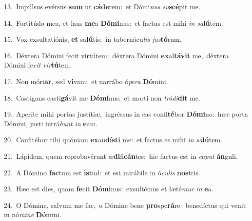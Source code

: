 {\numbfont\textcolor{\numbcolor}{13.}}~Impúlsus evérsus \textbf{sum} ut \textbf{cá}\-\textbf{de}rem:~\star et Dómi\textit{nus} \textit{su}\-\textbf{scé}pit me.\par
{\numbfont\textcolor{\numbcolor}{14.}}~Fortitúdo mea, et laus \textbf{me}\-a \textbf{Dó}\-\textbf{mi}nus:~\star et factus est mihi \textit{in} \textit{sa}\-\textbf{lú}tem.\par
{\numbfont\textcolor{\numbcolor}{15.}}~Vox exsultatiónis, \textbf{et} sa\-\textbf{lú}\-tis:~\star in tabernácu\textit{lis} \textit{jus}\-\textbf{tó}rum.\par
{\numbfont\textcolor{\numbcolor}{16.}}~Déxtera Dómini fecit virtútem:~\dagger déxtera Dómini \textbf{ex}\-al\-\textbf{tá}\-\textbf{vit} me,~\star déxtera Dómini fe\textit{cit} \textit{vir}\-\textbf{tú}tem.\par
{\numbfont\textcolor{\numbcolor}{17.}}~Non móri\-\textbf{ar}\-, sed \textbf{vi}\-vam:~\star et narrábo ó\-\textit{pe}\-\textit{ra} \textbf{Dó}\-mini.\par
{\numbfont\textcolor{\numbcolor}{18.}}~Castígans casti\-\textbf{gá}\-vit me \textbf{Dó}\-\textbf{mi}nus:~\star et morti non \textit{trá}\-\textit{di}\textbf{dit} me.\par
{\numbfont\textcolor{\numbcolor}{19.}}~Aperíte mihi portas justítiæ,~\dagger ingréssus in eas confi\-\textbf{té}\-bor \textbf{Dó}\-\textbf{mi}no:~\star hæc porta Dómini, justi intrá\textit{bunt} \textit{in} \textbf{e}\-am.\par
{\numbfont\textcolor{\numbcolor}{20.}}~Confitébor tibi quóniam \textbf{ex}\-au\-\textbf{dís}\-\textbf{ti} me:~\star et factus es mihi \textit{in} \textit{sa}\-\textbf{lú}tem.\par
{\numbfont\textcolor{\numbcolor}{21.}}~Lápidem, quem reprobavérunt æ\-\textbf{di}\-fi\-\textbf{cán}\-tes:~\star hic factus est in \textit{ca}\-\textit{put} \textbf{án}\-guli.\par
{\numbfont\textcolor{\numbcolor}{22.}}~A Dómino \textbf{fac}\-tum est \textbf{is}\-tud:~\star et est mirábile in ó\-\textit{cu}\-\textit{lis} \textbf{nos}\-tris.\par
{\numbfont\textcolor{\numbcolor}{23.}}~Hæc est dies, quam \textbf{fe}\-cit \textbf{Dó}\-\textbf{mi}nus:~\star exsultémus et læté\textit{mur} \textit{in} \textbf{e}\-a.\par
{\numbfont\textcolor{\numbcolor}{24.}}~O Dómine, salvum me fac,~\dagger o Dómine bene \textbf{pro}\-spe\-\textbf{rá}\-re:~\star benedíctus qui venit in nó\-\textit{mi}\-\textit{ne} \textbf{Dó}\-mini.\par
